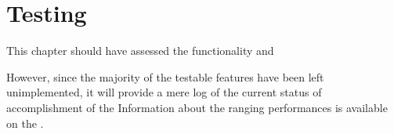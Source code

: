 \chapter{Testing}\label{ch:test}
This chapter should have assessed the functionality and

However, since the majority of the testable features have been left unimplemented, it will provide a mere log of the current status of accomplishment of the
Information about the ranging performances is available on the .


